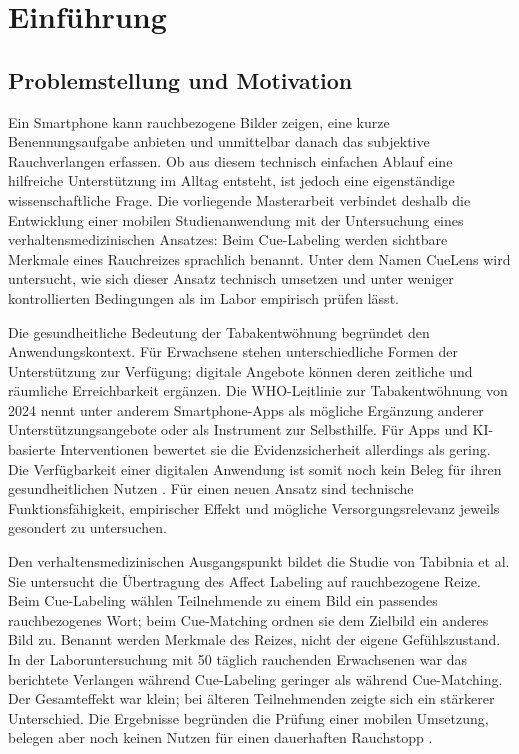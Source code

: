 
\chapter*{Einführung}
\begingroup
\raggedbottom
\setlength{\emergencystretch}{1em}

\section*{Problemstellung und Motivation}

Ein Smartphone kann rauchbezogene Bilder zeigen, eine kurze Benennungsaufgabe anbieten und unmittelbar danach das subjektive Rauchverlangen erfassen. Ob aus diesem technisch einfachen Ablauf eine hilfreiche Unterstützung im Alltag entsteht, ist jedoch eine eigenständige wissenschaftliche Frage. Die vorliegende Masterarbeit verbindet deshalb die Entwicklung einer mobilen Studienanwendung mit der Untersuchung eines verhaltensmedizinischen Ansatzes: Beim Cue-Labeling werden sichtbare Merkmale eines Rauchreizes sprachlich benannt. Unter dem Namen CueLens wird untersucht, wie sich dieser Ansatz technisch umsetzen und unter weniger kontrollierten Bedingungen als im Labor empirisch prüfen lässt.

Die gesundheitliche Bedeutung der Tabakentwöhnung begründet den Anwendungskontext. Für Erwachsene stehen unterschiedliche Formen der Unterstützung zur Verfügung; digitale Angebote können deren zeitliche und räumliche Erreichbarkeit ergänzen. Die WHO-Leitlinie zur Tabakentwöhnung von 2024 nennt unter anderem Smartphone-Apps als mögliche Ergänzung anderer Unterstützungsangebote oder als Instrument zur Selbsthilfe. Für Apps und KI-basierte Interventionen bewertet sie die Evidenzsicherheit allerdings als gering. Die Verfügbarkeit einer digitalen Anwendung ist somit noch kein Beleg für ihren gesundheitlichen Nutzen \cite{who_tobacco_cessation_guideline_2024}. Für einen neuen Ansatz sind technische Funktionsfähigkeit, empirischer Effekt und mögliche Versorgungsrelevanz jeweils gesondert zu untersuchen.

Den verhaltensmedizinischen Ausgangspunkt bildet die Studie von Tabibnia et al. Sie untersucht die Übertragung des Affect Labeling auf rauchbezogene Reize. Beim Cue-Labeling wählen Teilnehmende zu einem Bild ein passendes rauchbezogenes Wort; beim Cue-Matching ordnen sie dem Zielbild ein anderes Bild zu. Benannt werden Merkmale des Reizes, nicht der eigene Gefühlszustand. In der Laboruntersuchung mit 50 täglich rauchenden Erwachsenen war das berichtete Verlangen während Cue-Labeling geringer als während Cue-Matching. Der Gesamteffekt war klein; bei älteren Teilnehmenden zeigte sich ein stärkerer Unterschied. Die Ergebnisse begründen die Prüfung einer mobilen Umsetzung, belegen aber noch keinen Nutzen für einen dauerhaften Rauchstopp \cite{tabibnia_cuelabeling_2026}.

